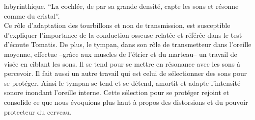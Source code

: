 labyrinthique. 
\enquote{La cochlée, de par sa grande densité, capte les sons
	et résonne comme du cristal}\autocite {tomatis_conf1972}.
\\
Ce rôle d'adaptation des tourbillons et non de transmission, 
est susceptible d'expliquer l'importance de  
la conduction osseuse relatée et référée dans le  test d'écoute Tomatis.
De plus, le tympan, dans son rôle de transmetteur dans l'oreille
          moyenne, effectue --grâce aux muscles de l'étrier et du marteau--
		un travail de visée en ciblant les sons. Il se tend pour se mettre en résonance avec les sons à 
		percevoir.
               Il fait aussi un autre travail qui est celui de sélectionner des sons
		pour se protéger. Ainsi le tympan se tend et se détend,
              amortit et adapte
l'intensité
		sonore inondant  l'oreille interne. Cette sélection pour se  protéger rejoint et consolide ce que nous 
		évoquions plus haut à propos des 
distorsions et du pouvoir protecteur du cerveau.
